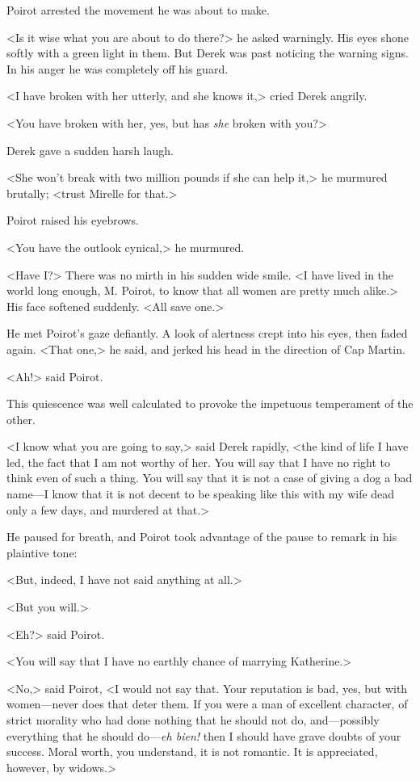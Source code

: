 Poirot arrested the movement he was about to make.

<Is it wise what you are about to do there?> he asked warningly. His eyes shone softly with a green light in them. But Derek was past noticing the warning signs. In his anger he was completely off his guard.

<I have broken with her utterly, and she knows it,> cried Derek angrily.

<You have broken with her, yes, but has \emph{she} broken with you?>

Derek gave a sudden harsh laugh.

<She won't break with two million pounds if she can help it,> he murmured brutally; <trust Mirelle for that.>

Poirot raised his eyebrows.

<You have the outlook cynical,> he murmured.

<Have I?> There was no mirth in his sudden wide smile. <I have lived in the world long enough, M. Poirot, to know that all women are pretty much alike.> His face softened suddenly. <All save one.>

He met Poirot's gaze defiantly. A look of alertness crept into his eyes, then faded again. <That one,> he said, and jerked his head in the direction of Cap Martin.

<Ah!> said Poirot.

This quiescence was well calculated to provoke the impetuous temperament of the other.

<I know what you are going to say,> said Derek rapidly, <the kind of life I have led, the fact that I am not worthy of her. You will say that I have no right to think even of such a thing. You will say that it is not a case of giving a dog a bad name—I know that it is not decent to be speaking like this with my wife dead only a few days, and murdered at that.>

He paused for breath, and Poirot took advantage of the pause to remark in his plaintive tone:

<But, indeed, I have not said anything at all.>

<But you will.>

<Eh?> said Poirot.

<You will say that I have no earthly chance of marrying Katherine.>

<No,> said Poirot, <I would not say that. Your reputation is bad, yes, but with women—never does that deter them. If you were a man of excellent character, of strict morality who had done nothing that he should not do, and—possibly everything that he should do—\emph{eh bien!} then I should have grave doubts of your success. Moral worth, you understand, it is not romantic. It is appreciated, however, by widows.>

